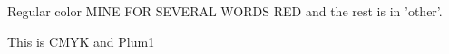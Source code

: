 \documentclass{article}
\begin{document}
Regular color
{\color{mine} MINE FOR SEVERAL WORDS}
{\color{red} RED}
\color{other}and the rest is in 'other'.

{\color{cm}This is CMYK}
and {\color{plum1}Plum1}
\end{document}

